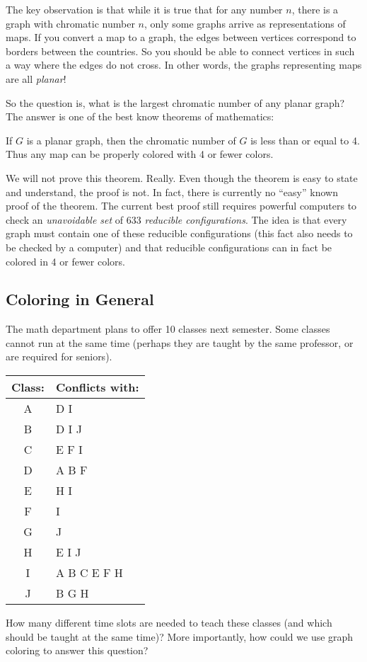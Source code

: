 \documentclass[12pt]{article}
\begin{document}
The key observation is that while it is true that for any number $n$, there is a graph with chromatic number $n$, only some graphs arrive as representations of maps.  If you convert a map to a graph, the edges between vertices correspond to borders between the countries.  So you should be able to connect vertices in such a way where the edges do not cross.  In other words, the graphs representing maps are all {\em planar}!

So the question is, what is the largest chromatic number of any planar graph?  The answer is one of the best know theorems of mathematics:

\begin{theorem}
If $G$ is a planar graph, then the chromatic number of $G$ is less than or equal to 4.  Thus any map can be properly colored with 4 or fewer colors.
\end{theorem}

We will not prove this theorem.  Really.  Even though the theorem is easy to state and understand, the proof is not.  In fact, there is currently no ``easy'' known proof of the theorem.  The current best proof still requires powerful computers to check an {\em unavoidable set} of  633 {\em reducible configurations}.  The idea is that every graph must contain one of these reducible configurations (this fact also needs to be checked by a computer) and that reducible configurations can in fact be colored in 4 or fewer colors. 


\subsection{Coloring in General}
\begin{activity}
The math department plans to offer 10 classes next semester.  Some classes cannot run at the same time (perhaps they are taught by the same professor, or are required for seniors).  

\begin{center}
\begin{tabular}{cl}
\textbf{Class:} & \textbf{Conflicts with:} \\ \hline
A & D I \\
B & D I J \\
C & E F I \\
D & A B F \\
E & H I\\
F & I\\
G & J \\
H & E I J\\
I & A B C E F H \\
J & B G H
\end{tabular}
\end{center}

How many different time slots are needed to teach these classes (and which should be taught at the same time)?  More importantly, how could we use graph coloring to answer this question?
\end{activity}
\end{document}

